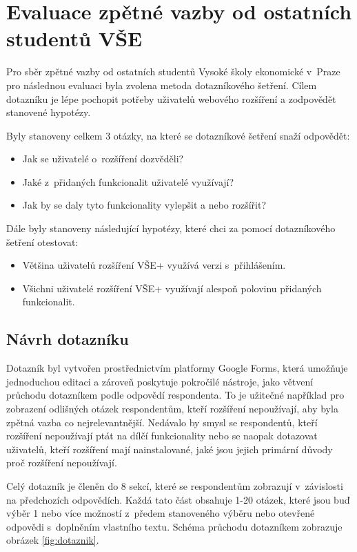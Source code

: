 \chapter{Evaluace zpětné vazby od ostatních studentů VŠE}

Pro sběr zpětné vazby od ostatních studentů Vysoké školy ekonomické v~Praze pro následnou evaluaci byla zvolena metoda dotazníkového šetření. Cílem dotazníku je lépe pochopit potřeby uživatelů webového rozšíření a zodpovědět stanovené hypotézy.

Byly stanoveny celkem 3 otázky, na které se dotazníkové šetření snaží odpovědět:

\begin{itemize}
    \item Jak se uživatelé o~rozšíření dozvěděli?
    \item Jaké z~přidaných funkcionalit uživatelé využívají?
    \item Jak by se daly tyto funkcionality vylepšit a nebo rozšířit?
\end{itemize}

Dále byly stanoveny následující hypotézy, které chci za pomocí dotazníkového šetření otestovat:

\begin{itemize}
    \item Většina uživatelů rozšíření VŠE+ využívá verzi s~přihlášením.
    \item Všichni uživatelé rozšíření VŠE+ využívají alespoň polovinu přidaných funkcionalit.
\end{itemize}

\section{Návrh dotazníku}

Dotazník byl vytvořen prostřednictvím platformy Google Forms, která umožňuje jednoduchou editaci a zároveň poskytuje pokročilé nástroje, jako větvení průchodu dotazníkem podle odpovědí respondenta. To je užitečné například pro zobrazení odlišných otázek respondentům, kteří rozšíření nepoužívají, aby byla zpětná vazba co nejrelevantnější. Nedávalo by smysl se respondentů, kteří rozšíření nepoužívají ptát na dílčí funkcionality nebo se naopak dotazovat uživatelů, kteří rozšíření mají nainstalované, jaké jsou jejich primární důvody proč rozšíření nepoužívají. 

Celý dotazník je členěn do 8 sekcí, které se respondentům zobrazují v~závislosti na předchozích odpovědích. Každá tato část obsahuje 1-20 otázek, které jsou buď výběr 1 nebo více možností z~předem stanoveného výběru nebo otevřené odpovědi s~doplněním vlastního textu. Schéma průchodu dotazníkem zobrazuje obrázek \ref{fig:dotaznik}.

